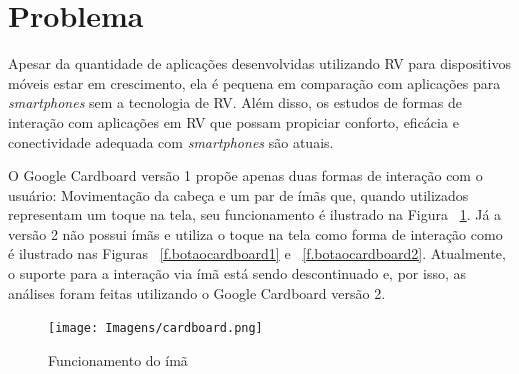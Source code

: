 \section{Problema}
\label{s.problema}

Apesar da quantidade de aplicações desenvolvidas utilizando RV para dispositivos móveis estar em crescimento, ela é pequena em comparação com aplicações para \textit{smartphones} sem a tecnologia de RV. Além disso, os estudos de formas de interação com aplicações em RV que possam propiciar conforto, eficácia e conectividade adequada com \textit{smartphones} são atuais. 

O Google Cardboard versão 1 propõe apenas duas formas de interação com o usuário: Movimentação da cabeça e um par de ímãs que, quando utilizados representam um toque na tela, seu funcionamento é ilustrado na Figura ~\ref{f.cardboard1}. Já a versão 2 não possui ímãs e utiliza o toque na tela como forma de interação como é ilustrado nas Figuras ~\ref{f.botaocardboard1} e ~\ref{f.botaocardboard2}. Atualmente, o suporte para a interação via ímã está sendo descontinuado e, por isso, as análises foram feitas utilizando o Google Cardboard versão 2.

\begin{figure}[H]
	\caption{\small Funcionamento do ímã}
	\centering
	\texttt{[image: Imagens/cardboard.png]}
	\label{f.cardboard1}
\end{figure}

